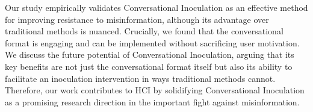 \documentclass[sigconf]{acmart}
\begin{document}






Our study empirically validates Conversational Inoculation as an effective method for improving resistance to misinformation, although its advantage over traditional methods is nuanced. 
Crucially, we found that the conversational format is engaging and can be implemented without sacrificing user motivation.
We discuss the future potential of Conversational Inoculation, arguing that its key benefits are not just the conversational format itself but also its ability to facilitate an inoculation intervention in ways traditional methods cannot.
Therefore, our work contributes to HCI by solidifying Conversational Inoculation as a promising research direction in the important fight against misinformation.
\end{document}
